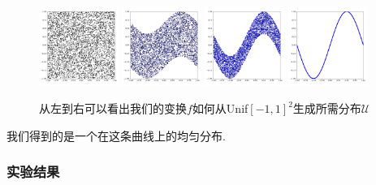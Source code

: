 \documentclass[lang=cn,11pt]{elegantpaper}
\begin{document}
\begin{figure}[hbt]
\centering
  \includegraphics[width=0.23\textwidth]{sin_1_1}  
  \includegraphics[width=0.23\textwidth]{sin_1_2}
  \includegraphics[width=0.23\textwidth]{sin_1_3}
  \includegraphics[width=0.23\textwidth]{sin_1_4}
  \caption{从左到右可以看出我们的变换$f$如何从Unif$[-1,1]^2$生成所需分布$\mathcal U$}
\end{figure}

我们得到的是一个在这条曲线上的均匀分布.

\subsubsection{实验结果}
\end{document}
